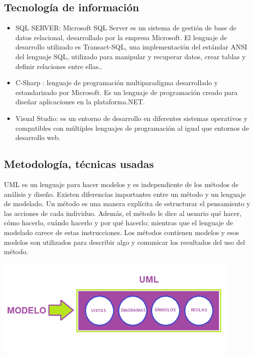 \documentclass[preprint,12pt]{elsarticle}
\begin{document}
\subsection{\textbf{Tecnología de información  }}
		\begin{itemize}
	\item 	SQL SERVER: Microsoft SQL Server es un sistema de gestión de base de datos relacional, desarrollado por la empresa Microsoft. El lenguaje de desarrollo utilizado es Transact-SQL, una implementación del estándar ANSI del lenguaje SQL, utilizado para manipular y recuperar datos, crear tablas y definir relaciones entre ellas..
	\item 	C-Sharp : lenguaje de programación multiparadigma desarrollado y estandarizado por Microsoft. Es un lenguaje de programación creado para diseñar aplicaciones en la plataforma.NET.
	\item 	Visual Studio: es un entorno de desarrollo en diferentes sistemas operativos y compatibles con múltiples lenguajes de programación al igual que entornos de desarrollo web. 
	\end{itemize}
\subsection{\textbf{ Metodología, técnicas usadas  }}
UML es un lenguaje para hacer modelos y es independiente de los métodos de análisis y diseño. Existen diferencias importantes entre un método y un lenguaje de modelado. Un método es una manera explícita de estructurar el pensamiento y las acciones de cada individuo. Además, el método le dice al usuario qué hacer, cómo hacerlo, cuándo hacerlo y por qué hacerlo; mientras que el lenguaje de modelado carece de estas instrucciones. Los métodos contienen modelos y esos modelos son utilizados para describir algo y comunicar los resultados del uso del método.
          \begin{center}
	\includegraphics[width=12cm]{./imagen/5} 
	\end{center}
		
\end{document}
